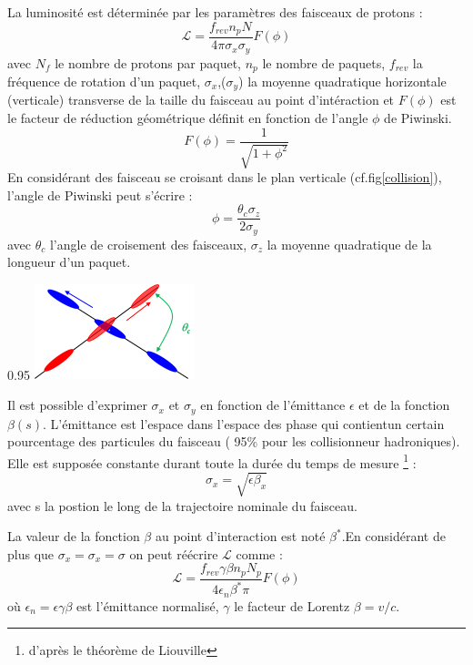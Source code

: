 La luminosité est déterminée par les paramètres des faisceaux de protons :
\begin{equation}
\mathcal{L}=\frac{f_{rev}n_{p}N_{}}{4\pi \sigma_{x} \sigma_{y}} F(\phi)
\end{equation}
avec $N_{f}$ le nombre de protons par paquet, $n_{p}$ le nombre de paquets, $f_{rev}$ la fréquence de rotation d'un paquet, $\sigma_{x}$,($\sigma_{y}$) la moyenne quadratique horizontale (verticale) transverse de la taille du faisceau au point d'intéraction et $F(\phi)$ est le facteur de réduction géométrique définit en fonction de l'angle $\phi$ de Piwinski.
\begin{equation}
F(\phi)=\frac{1}{\sqrt{1+\phi^{2}}}
\end{equation}
En considérant des faisceau se croisant dans le plan verticale (cf.fig\ref{collision}), l'angle de Piwinski peut s'écrire :
\begin{equation}
\phi=\frac{\theta_{c}\sigma_{z}}{2\sigma_{y}}
\end{equation}
avec $\theta_{c}$ l'angle de croisement des faisceaux, $\sigma_{z}$ la moyenne quadratique de la longueur d'un paquet.


\begin{minipagewithmarginpars}[h]{0.95\textwidth}
\centering
\includegraphics[width=0.35\textwidth]{LHC/collision.png}
\label{collision}	
\end{minipagewithmarginpars}

Il est possible d'exprimer $\sigma_{x}$ et $\sigma_{y}$ en fonction de l'émittance $\epsilon$ et de la fonction $\beta(s)$. L'émittance est l'espace dans l'espace des phase qui contientun certain pourcentage des particules du faisceau ( 95\% pour les collisionneur hadroniques). Elle est supposée constante durant toute la durée du temps de mesure \footnote{d'après le théorème de Liouville} :
\begin{equation}
\sigma_{x}=\sqrt{\epsilon\beta_{x}}
\end{equation}
avec s la postion le long de la trajectoire nominale du faisceau.

La valeur de la fonction $\beta$ au point d'interaction est noté $\beta^{*}$.En considérant de plus que $\sigma_{x}=\sigma_{x}=\sigma$ on peut réécrire $\mathcal{L}$ comme :
\begin{equation}
\mathcal{L}=\frac{f_{rev}\gamma\beta n_{p}N_{p}}{4\epsilon_{n}\beta^{*}\pi} F(\phi)
\end{equation}
où $\epsilon_{n}=\epsilon\gamma\beta$ est l'émittance normalisé, $\gamma$ le facteur de Lorentz $\beta=v/c$.

